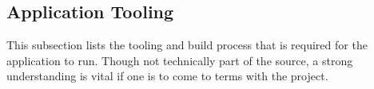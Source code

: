 \subsection{Application Tooling} %
\label{sub:api_models}
This subsection lists the tooling and build process that is required for the application to run. Though not technically part of the source, a strong understanding is vital if one is to come to terms with the project.

